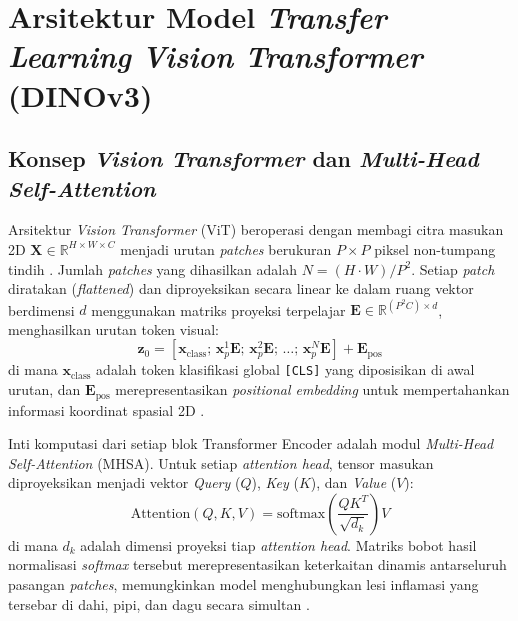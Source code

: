 
\section{Arsitektur Model \textit{Transfer Learning} \textit{Vision Transformer} (DINOv3)}

\subsection{Konsep \textit{Vision Transformer} dan \textit{Multi-Head Self-Attention}}
Arsitektur \textit{Vision Transformer} (ViT) beroperasi dengan membagi citra masukan 2D $\mathbf{X} \in \mathbb{R}^{H \times W \times C}$ menjadi urutan \textit{patches} berukuran $P \times P$ piksel non-tumpang tindih \cite{dosovitskiy2020image}. Jumlah \textit{patches} yang dihasilkan adalah $N = (H \cdot W) / P^2$. Setiap \textit{patch} diratakan (\textit{flattened}) dan diproyeksikan secara linear ke dalam ruang vektor berdimensi $d$ menggunakan matriks proyeksi terpelajar $\mathbf{E} \in \mathbb{R}^{(P^2 C) \times d}$, menghasilkan urutan token visual:
\begin{equation}
    \mathbf{z}_0 = [\mathbf{x}_{\text{class}}; \, \mathbf{x}_p^1 \mathbf{E}; \, \mathbf{x}_p^2 \mathbf{E}; \, \dots; \, \mathbf{x}_p^N \mathbf{E}] + \mathbf{E}_{\text{pos}}
\end{equation}
di mana $\mathbf{x}_{\text{class}}$ adalah token klasifikasi global \texttt{[CLS]} yang diposisikan di awal urutan, dan $\mathbf{E}_{\text{pos}}$ merepresentasikan \textit{positional embedding} untuk mempertahankan informasi koordinat spasial 2D \cite{dosovitskiy2020image}.

Inti komputasi dari setiap blok Transformer Encoder adalah modul \textit{Multi-Head Self-Attention} (MHSA). Untuk setiap \textit{attention head}, tensor masukan diproyeksikan menjadi vektor \textit{Query} ($Q$), \textit{Key} ($K$), dan \textit{Value} ($V$):
\begin{equation}
    \text{Attention}(Q, K, V) = \text{softmax}\left(\frac{Q K^T}{\sqrt{d_k}}\right) V
\end{equation}
di mana $d_k$ adalah dimensi proyeksi tiap \textit{attention head}. Matriks bobot hasil normalisasi \textit{softmax} tersebut merepresentasikan keterkaitan dinamis antarseluruh pasangan \textit{patches}, memungkinkan model menghubungkan lesi inflamasi yang tersebar di dahi, pipi, dan dagu secara simultan \cite{dosovitskiy2020image}.

